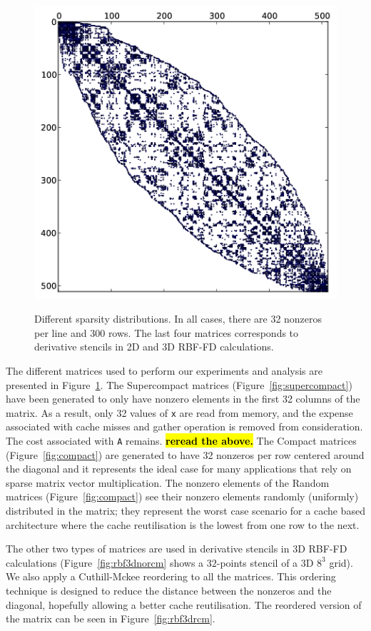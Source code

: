 \documentclass[10pt,conference,compsocconf]{IEEEtran}
\newcommand{\todo}[1]{{\color{red}\textbf{\hl{#1}}\xspace}}
\begin{document}
\begin{figure}[tbh]
\begin{center}
{      \includegraphics[width=\ww]{figures/kd-tree-3d-rcm-crop.png}}%
  \end{center}
  
  \caption{Different sparsity distributions. In all cases, there are
    32 nonzeros per line and 300 rows. The last four matrices
    corresponds to derivative stencils in 2D and 3D RBF-FD
    calculations.}
  \label{fig:spy_plots}
\end{figure}

The different matrices used to perform our experiments and analysis
are presented in Figure~\ref{fig:spy_plots}. The
Supercompact matrices (Figure~\ref{fig:supercompact}) have been
generated to only have nonzero elements in the first 32 columns of
the matrix. As a result, only 32 values of {\tt x} are read
from memory, and the expense associated with cache misses and gather
operation is removed from consideration. The cost associated with 
{\tt A} remains.   \todo{reread the above.}
The Compact matrices
(Figure~\ref{fig:compact}) are generated to have 32 nonzeros per row
centered around the diagonal and it represents the ideal case for many
applications that rely on sparse matrix vector multiplication. The nonzero
elements of the Random
matrices (Figure~\ref{fig:compact}) see their nonzero elements
randomly (uniformly) distributed in the matrix; they represent the
worst case scenario for a cache based architecture where the cache
reutilisation is the lowest from one row to the next.

The other two types of matrices are used in derivative stencils in 3D
RBF-FD calculations (Figure~\ref{fig:rbf3dnorcm} shows a $32$-points
stencil of a 3D $8^3$ grid). We also apply a Cuthill-Mckee reordering to
all the matrices.  This ordering technique is designed to reduce the
distance between the nonzeros and the diagonal, hopefully allowing a
better cache reutilisation. The reordered version of the matrix can be
seen in Figure~\ref{fig:rbf3drcm}.
\end{document}
